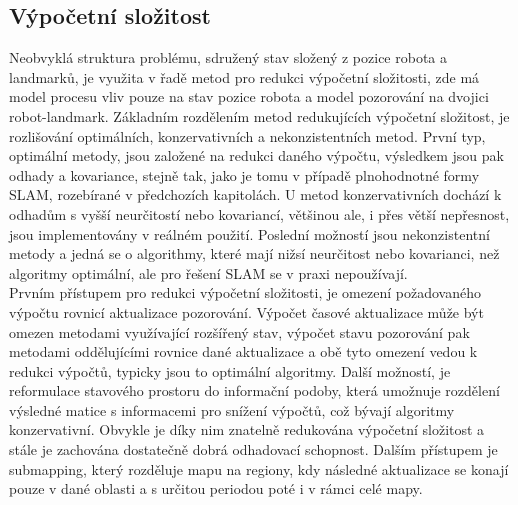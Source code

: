 \documentclass[11pt]{article}
\begin{document}
\subsection{Výpočetní složitost}
Neobvyklá struktura problému, sdružený stav složený z pozice robota a landmarků, je využita v řadě metod pro redukci výpočetní složitosti, zde má model procesu vliv pouze na stav pozice robota a model pozorování na dvojici robot-landmark. Základním rozdělením metod redukujících výpočetní složitost, je rozlišování optimálních, konzervativních a nekonzistentních metod. První typ, optimální metody, jsou založené na redukci daného výpočtu, výsledkem jsou pak odhady a kovariance, stejně tak, jako je tomu v případě plnohodnotné formy SLAM, rozebírané v předchozích kapitolách. U metod konzervativních dochází k odhadům s vyšší neurčitostí nebo kovariancí, většinou ale, i přes větší nepřesnost, jsou implementovány v reálném použití. Poslední možností jsou nekonzistentní metody a jedná se o algorithmy, které mají nižsí neurčitost nebo kovarianci, než algoritmy optimální, ale pro řešení SLAM se v praxi nepoužívají.\\
\indent Prvním přístupem pro redukci výpočetní složitosti, je omezení požadovaného výpočtu rovnicí aktualizace pozorování. Výpočet časové aktualizace může být omezen metodami využívající rozšířený stav, výpočet stavu pozorování pak metodami oddělujícími rovnice dané aktualizace a obě tyto omezení vedou k redukci výpočtů, typicky jsou to optimální algoritmy. Další možností, je reformulace stavového prostoru do informační podoby, která umožnuje rozdělení výsledné matice s informacemi pro snížení výpočtů, což bývají algoritmy konzervativní. Obvykle je díky nim znatelně redukována výpočetní složitost a stále je zachována dostatečně dobrá odhadovací schopnost. Dalším přístupem je submapping, který rozděluje mapu na regiony, kdy následné aktualizace se konají pouze v dané oblasti a s určitou periodou poté i v rámci celé mapy. 
\end{document}

